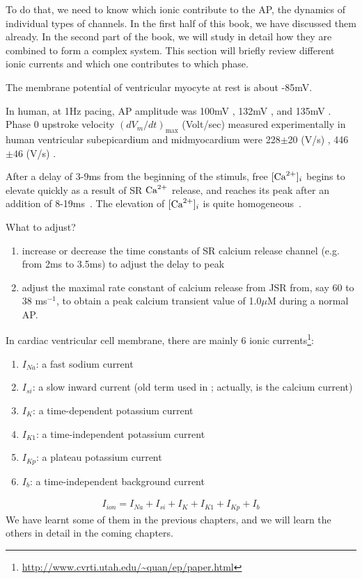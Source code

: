 To do that, we need to know which ionic contribute to the AP, the
dynamics of individual types of channels. In the first half of this
book, we have discussed them already. In the second part of the book,
we will study in detail how they are combined to form a complex
system. This section will briefly review different ionic currents and
which one contributes to which phase.

The membrane potential of ventricular myocyte at rest is about -85mV. 

In human, at 1Hz pacing, AP amplitude was 100mV \citep{li1999}, 132mV
\citep{li1998}, and 135mV \citep{nabauer1996}. Phase 0 upstroke velocity
$(dV_m/dt)_\max$ (Volt/sec) measured experimentally in human ventricular
subepicardium and midmyocardium were 228$\pm$20 (V/s) \citep{drouin1995},
446$\pm 46$ (V/s) \citep{pereon2000}.

After a delay of 3-9ms from the beginning of the stimuls, free
$[{\text{Ca}^{2+}}]_i$ begins to elevate quickly as a result of SR ${\text{Ca}^{2+}}$ release,
and reaches its peak after an addition of
8-19ms~\citep{cleeman1991}. The elevation of $[{\text{Ca}^{2+}}]_i$ is quite
homogeneous~\citep{takamatsu1989}. 

\begin{framed}
  What to adjust?
  \begin{enumerate}
  \item increase or decrease the time constants of SR calcium release
    channel (e.g. from 2ms to 3.5ms) to adjust the delay to peak
  \item adjust the maximal rate constant of calcium release from JSR
    from, say 60 to 38 ms$^{-1}$, to obtain a peak calcium transient
    value of 1.0$\mu$M during a normal AP.
  \end{enumerate}
\end{framed}


In cardiac ventricular cell membrane, there are mainly 6 ionic
currents\footnote{\url{http://www.cvrti.utah.edu/~quan/ep/paper.html}}: 
\begin{enumerate}
\item $I_{Na}$: a fast sodium current
\item $I_{si}$: a slow inward current (old term used in
  \citep{trautwein1973sic,beeler1977rap}; actually, is the calcium
  current)
\item $I_{K}$: a time-dependent potassium current
\item $I_{K1}$: a time-independent potassium current
\item $I_{Kp}$: a plateau potassium current
\item $I_b$: a time-independent background current
\end{enumerate}
\begin{eqnarray}
  \label{eq:396}
  I_{ion} = I_{Na} + I_{si} + I_{K} + I_{K1} + I_{Kp} + I_{b}
\end{eqnarray}
We have learnt some of them in the previous chapters, and we will
learn the others in detail in the coming chapters.

